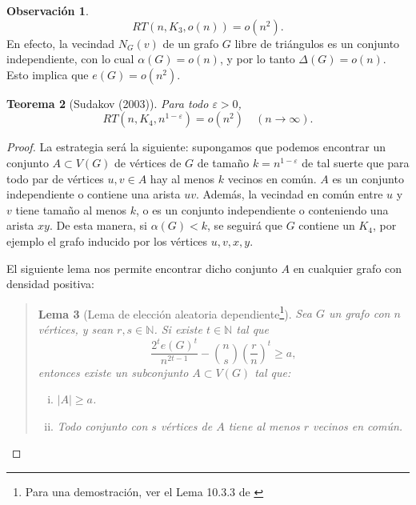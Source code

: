 \documentclass[12pt]{report}
\theoremstyle{plain}
\newtheorem{theorem}{Teorema}[section]
\newtheorem{lemma}[theorem]{Lema}
\theoremstyle{definition}
\newtheorem{obs}[theorem]{Observación}
\newcommand{\naturals}{\mathbb{N}}
\newcommand{\abs}[1]{\left \vert #1 \right \vert}
\begin{document}
\begin{obs}
\[
    RT (n, K_3, o (n)) = o(n^2).
\]
En efecto, la vecindad $N_G (v)$ de un grafo $G$ libre de triángulos es un conjunto independiente, con lo cual $\alpha (G) = o (n)$, y por lo tanto $\Delta (G) = o (n)$. Esto implica que $e(G) = o (n^2)$.
\end{obs}

\begin{theorem}[Sudakov (2003)]
Para todo $\varepsilon > 0$,
\[
    RT (n, K_4, n^{1-\varepsilon}) = o (n^2) \quad (n \to \infty).
\]

\end{theorem}

\begin{proof}
La estrategia será la siguiente: supongamos que podemos encontrar un conjunto $A \subset V(G)$ de vértices de $G$ de tamaño $k = n^{1- \varepsilon}$ de tal suerte que para todo par de vértices $u,v \in A$ hay al menos $k$ vecinos en común. $A$ es un conjunto independiente o contiene una arista $uv$. Además, la vecindad en común entre $u$ y $v$ tiene tamaño al menos $k$, o es un conjunto independiente o conteniendo una arista $xy$. De esta manera, si $\alpha (G) < k$, se seguirá que $G$ contiene un $K_4$, por ejemplo el grafo inducido por los vértices $u,v,x,y$.

El siguiente lema nos permite encontrar dicho conjunto $A$ en cualquier grafo con densidad positiva:
\vspace{-20pt}
\begin{quote}
\begin{lemma}[Lema de elección aleatoria dependiente\footnote{
Para una demostración, ver el Lema 10.3.3 de \cite{botler2022combinatoria}
}]\label{lema:eleccion aleatoria dependiente}
Sea $G$ un grafo con $n$ vértices, y sean $r,s \in \naturals$. Si existe $t \in \naturals$ tal que
\[
    \frac{2^t e(G)^t}{n^{2t - 1}} - \binom n s \left ( \frac r n \right )^t \geq a,
\]
entonces existe un subconjunto $A \subset V(G)$ tal que:
\begin{enumerate}[(i)]
\item $\abs A \geq a$.
\item Todo conjunto con $s$ vértices de $A$ tiene al menos $r$ vecinos en común.
\end{enumerate}
\end{lemma}
\end{quote}


\end{proof}
\end{document}
